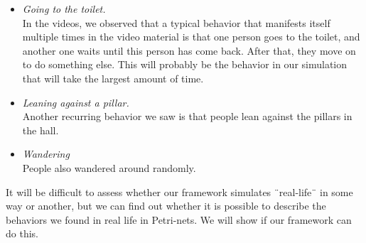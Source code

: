 \documentclass[11pt]{book}
\begin{document}
\begin{itemize}
\item \emph{Going to the toilet.}
\\In the videos, we observed that a typical behavior that manifests itself multiple times in the video material is that one person goes to the toilet, and another one waits until this person has come back. After that, they move on to do something else. This will probably be the behavior in our simulation that will take the largest amount of time.

\item \emph{Leaning against a pillar.}
\\Another recurring behavior we saw is that people lean against the pillars in the hall. 

\item \emph{Wandering}\\
People also wandered around randomly.
\end{itemize}

It will be difficult to assess whether our framework simulates ¨real-life¨ in some way or another, but we can find out whether it is possible to describe the behaviors we found in real life in Petri-nets. We will show if our framework can do this.

\end{document}
